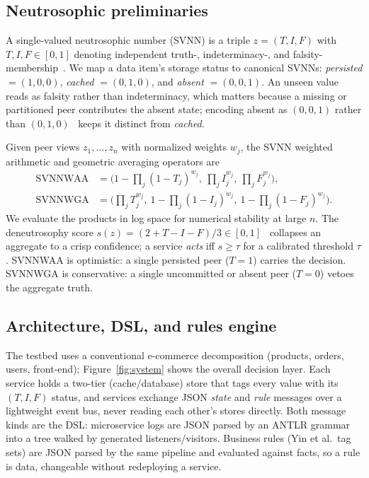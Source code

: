 \documentclass[fleqn,10pt]{wlscirep}
\begin{document}
\subsection{Neutrosophic preliminaries}
A single-valued neutrosophic number (SVNN) is a triple $z=(T,I,F)$ with $T,I,F\in[0,1]$ denoting
independent truth-, indeterminacy-, and falsity-membership~\cite{wang2010svns}. We map a data item's
storage status to canonical SVNNs: \emph{persisted} $=(1,0,0)$, \emph{cached} $=(0,1,0)$, and
\emph{absent} $=(0,0,1)$. An unseen value reads as falsity rather than indeterminacy, which matters
because a missing or partitioned peer contributes the absent state; encoding absent as $(0,0,1)$ rather
than $(0,1,0)$~\cite{elghareeb2020neutro} keeps it distinct from \emph{cached}.

Given peer views $z_1,\dots,z_n$ with normalized weights $w_j$, the SVNN weighted arithmetic and
geometric averaging operators are
\begin{align}
\mathrm{SVNNWAA} &= \Big(1-\textstyle\prod_j (1-T_j)^{w_j},\ \prod_j I_j^{w_j},\ \prod_j F_j^{w_j}\Big),
\label{eq:waa}\\
\mathrm{SVNNWGA} &= \Big(\textstyle\prod_j T_j^{w_j},\ 1-\prod_j (1-I_j)^{w_j},\ 1-\prod_j (1-F_j)^{w_j}\Big).
\label{eq:wga}
\end{align}
We evaluate the products in log space for numerical stability at large $n$. The deneutrosophy score
$s(z)=(2+T-I-F)/3\in[0,1]$~\cite{ye2014score} collapses an aggregate to a crisp confidence; a service
\emph{acts} iff $s\geq\tau$ for a calibrated threshold $\tau$. SVNNWAA is optimistic: a single
persisted peer ($T=1$) carries the decision. SVNNWGA is conservative: a single uncommitted or absent
peer ($T=0$) vetoes the aggregate truth.

\subsection{Architecture, DSL, and rules engine}
The testbed uses a conventional e-commerce decomposition (products, orders, users, front-end);
Figure~\ref{fig:system} shows the overall decision layer. Each
service holds a two-tier (cache/database) store that tags every value with its $(T,I,F)$ status, and
services exchange JSON \emph{state} and \emph{rule} messages over a lightweight event bus, never
reading each other's stores directly. Both message kinds are the DSL: microservice logs are JSON
parsed by an ANTLR grammar into a tree walked by generated listeners/visitors. Business rules
(Yin et al.\ tag sets) are JSON parsed by the same pipeline and evaluated against facts, so a rule is
data, changeable without redeploying a service.
\end{document}
